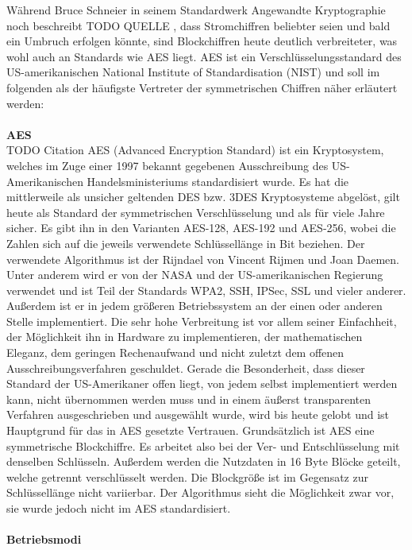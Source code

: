 \documentclass[13pt,a4paper,bibliography=totocnumbered,listof=totocnumbered]{scrartcl}
\begin{document}
Während Bruce Schneier in seinem Standardwerk Angewandte Kryptographie noch beschreibt TODO QUELLE , dass Stromchiffren beliebter seien und bald ein Umbruch erfolgen könnte, sind Blockchiffren heute deutlich verbreiteter, was wohl auch an Standards wie AES liegt. AES ist ein Verschlüsselungsstandard des US-amerikanischen National Institute of Standardisation (NIST) und soll im folgenden als der häufigste Vertreter der symmetrischen Chiffren näher erläutert werden:\\
\\\textbf{AES}\\ TODO Citation \cite{4}
AES (Advanced Encryption Standard) ist ein Kryptosystem, welches im Zuge einer 1997 bekannt gegebenen Ausschreibung des US-Amerikanischen Handelsministeriums standardisiert wurde. Es hat die mittlerweile als unsicher geltenden DES bzw. 3DES Kryptosysteme abgelöst, gilt heute als Standard der symmetrischen Verschlüsselung und als für viele Jahre sicher. Es gibt ihn in den Varianten AES-128, AES-192 und AES-256, wobei die Zahlen sich auf die jeweils verwendete Schlüssellänge in Bit beziehen. Der verwendete Algorithmus ist der Rijndael von Vincent Rijmen und Joan Daemen. Unter anderem wird er von der NASA und der US-amerikanischen Regierung verwendet und ist Teil der Standards WPA2, SSH, IPSec, SSL und vieler anderer. Außerdem ist er in jedem größeren Betriebssystem an der einen oder anderen Stelle implementiert. Die sehr hohe Verbreitung ist vor allem seiner Einfachheit, der Möglichkeit ihn in Hardware zu implementieren, der mathematischen Eleganz, dem geringen Rechenaufwand und nicht zuletzt dem offenen Ausschreibungsverfahren geschuldet. Gerade die Besonderheit, dass dieser Standard der US-Amerikaner offen liegt, von jedem selbst implementiert werden kann, nicht übernommen werden muss und in einem äußerst transparenten Verfahren ausgeschrieben und ausgewählt wurde, wird bis heute gelobt und ist Hauptgrund für das in AES gesetzte Vertrauen. Grundsätzlich ist AES eine symmetrische Blockchiffre. Es arbeitet also bei der Ver- und Entschlüsselung mit denselben Schlüsseln. Außerdem werden die Nutzdaten in 16 Byte Blöcke geteilt, welche getrennt verschlüsselt werden. Die Blockgröße ist im Gegensatz zur Schlüssellänge nicht variierbar. Der Algorithmus sieht die Möglichkeit zwar vor, sie wurde jedoch nicht im AES standardisiert.\\
\\\textbf{Betriebsmodi}\\
\end{document}
